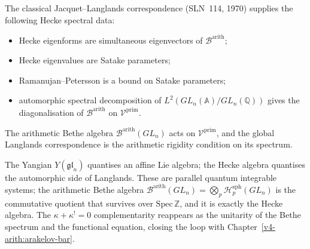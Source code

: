 \begin{theorem}
\label{v4-arith:thm:langlands-is-arithmetic-bethe}
The classical Jacquet--Langlands
correspondence (SLN~114, 1970) supplies the following Hecke spectral
data:
\begin{itemize}
\item Hecke eigenforms are simultaneous eigenvectors of
\(\mathcal{B}^{\mathrm{arith}}\);
\item Hecke eigenvalues are Satake parameters;
\item Ramanujan--Petersson is a bound on Satake parameters;
\item automorphic spectral decomposition of
\(L^{2}(GL_{n}(\mathbb{A})/GL_{n}(\mathbb{Q}))\) gives the
diagonalisation of \(\mathcal{B}^{\mathrm{arith}}\) on
\(\mathcal{V}^{\mathrm{prim}}\).
\end{itemize}
The arithmetic Bethe algebra \(\mathcal{B}^{\mathrm{arith}}(GL_{n})\)
acts on \(\mathcal{V}^{\mathrm{prim}}\), and the global Langlands
correspondence is the arithmetic rigidity condition on its spectrum.
\end{theorem}

The Yangian \(Y(\mathfrak{gl}_{n})\) quantises an affine Lie
algebra; the Hecke algebra quantises the automorphic side of
Langlands. These are parallel quantum integrable systems; the
arithmetic Bethe algebra \(\mathcal{B}^{\mathrm{arith}}(GL_{n})
=\bigotimes_{p}\mathcal{H}_{p}^{\mathrm{sph}}(GL_{n})\) is the
commutative quotient that survives over \(\mathrm{Spec}\,\mathbb{Z}\),
and it is exactly the Hecke algebra. The \(\kappa+\kappa^{!}=0\)
complementarity reappears as the unitarity of the Bethe spectrum
and the functional equation, closing the loop with
Chapter~\ref{v4-arith:arakelov-bar}.
